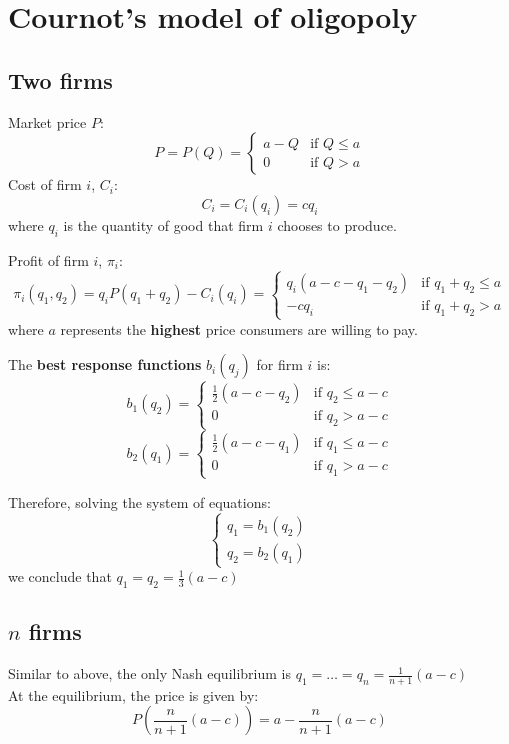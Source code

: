 \documentclass[11pt,a4paper]{article}
\begin{document}
\section{Cournot's model of oligopoly}
\subsection{Two firms}
Market price $P$:
\[
P = P(Q) = 
\begin{cases}
    a - Q & \text{if } Q \leqslant a \\
    0     & \text{if } Q > a 
    \end{cases}
\]
Cost of firm $i$, $C_i$:
\[
C_i = C_i(q_i) = cq_i 
\]
where $q_i$ is the quantity of good that firm $i$ chooses to produce. \par

Profit of firm $i$, $\pi_i$:
\[
\pi_i(q_1, q_2) = q_i P(q_1 + q_2) - C_i(q_i) =
\begin{cases}
    q_i (a - c - q_1 - q_2) & \text{if } q_1 + q_2 \leqslant a \\
    -cq_i                   & \text{if } q_1 + q_2 > a
\end{cases}
\]
where $a$ represents the \textbf{highest} price consumers are willing to pay. \par

The \textbf{best response functions} $b_i(q_j)$ for firm $i$ is:
\[
b_1(q_2) =
\begin{cases}
    \frac{1}{2}(a - c - q_2) & \text{if } q_2 \leqslant a - c \\
    0                        & \text{if } q_2 > a - c
\end{cases}
\]
\[
b_2(q_1) =
\begin{cases}
    \frac{1}{2}(a - c - q_1) & \text{if } q_1 \leqslant a - c \\
    0                        & \text{if } q_1 > a - c
\end{cases}
\]

Therefore, solving the system of equations:
\[
\begin{cases}
    q_1 = b_1(q_2) \\
    q_2 = b_2(q_1)
\end{cases}
\]
we conclude that $q_1 = q_2 = \frac{1}{3}(a - c)$

\subsection{\texorpdfstring{$n$ firms}{n firms}}
Similar to above, the only Nash equilibrium is $q_1 = \dots = q_n = \frac{1}{n+1} (a - c)$ \\
At the equilibrium, the price is given by:
\[
P(\frac{n}{n+1} (a - c)) = a - \frac{n}{n+1} (a - c)
\]
\end{document}
